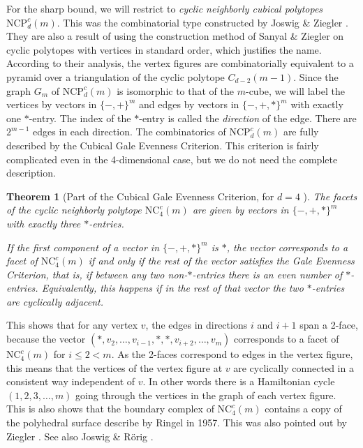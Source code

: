 \documentclass[a4paper,12pt]{book}
\theoremstyle{plain}
\newtheorem{theorem}{Theorem}[section]
\theoremstyle{definition}
\newcommand\NC{\textrm{NCP}}
\newcommand\NCC{\mathrm{NC}^c}
\begin{document}
For the sharp bound, we will restrict to \textit{cyclic neighborly cubical polytopes} 
 $\NC^c_d(m)$.
This was the combinatorial type constructed by Joswig \& Ziegler \cite{Z62}. They
are also a result of using the construction method of Sanyal \& Ziegler \cite{Z102}
on cyclic polytopes with vertices in standard order, which justifies the name.  According
to their analysis, the vertex figures are combinatorially equivalent to a pyramid over
a triangulation of the cyclic polytope $C_{d-2}(m-1)$. Since the graph $G_m$ of $\NC^c_d(m)$
is isomorphic to that of the $m$-cube, we will label the vertices by vectors in $\{-,+\}^m$ and
edges by vectors in $\{-,+,*\}^m$ with exactly one $*$-entry. The index of the $*$-entry is
called the \textit{direction} of the edge. There are $2^{m-1}$ edges in each direction.
The combinatorics of $\NC^c_d(m)$ are fully described by the Cubical Gale Evenness Criterion.
This criterion is fairly complicated even in the 4-dimensional case, but we do not need the 
complete description.

\begin{theorem}
[Part of the Cubical Gale Evenness Criterion, for $d=4$ {\cite[Thm.~18]{Z62}}] 
The facets of the cyclic neighborly polytope $\NCC_4(m)$ are given by vectors in
$\{-,+,*\}^m$ with exactly three $*$-entries. 

If the first component of a vector in $\{-,+,*\}^m$ is $*$, the vector corresponds to a facet 
of $\NCC_4(m)$ if and only if the rest of the vector satisfies the Gale Evenness Criterion, 
that is, if between any two non-$*$-entries there is an even number of $*$-entries.
Equivalently, this happens if in the rest of that vector the two $*$-entries are
cyclically adjacent.
\end{theorem}

 This shows that for any vertex $v$, the edges in directions $i$ and $i+1$ span a 2-face, because
the vector $(*,v_2, \dots, v_{i-1}, *, *, v_{i+2}, \dots, v_m)$ corresponds to a facet of $\NCC_4(m)$
for $i\le 2 < m$. As the 2-faces correspond to edges in the vertex figure, this means that the vertices 
of the vertex figure at $v$ are cyclically connected in a consistent way independent of $v$. In other words
there is a Hamiltonian cycle $(1,2,3,\dots, m)$ going through the vertices in the graph of each vertex figure.
This is also shows that the boundary complex of $\NCC_4(m)$ contains a copy of the polyhedral surface 
describe by Ringel \cite{ringel55:_ueber_probl_wuerf_wuerf} in 1957. This was also pointed out by
Ziegler \cite[Sect 3.]{Z100}. See also Joswig \& Rörig \cite{joswig:_neigh}.
\end{document}
